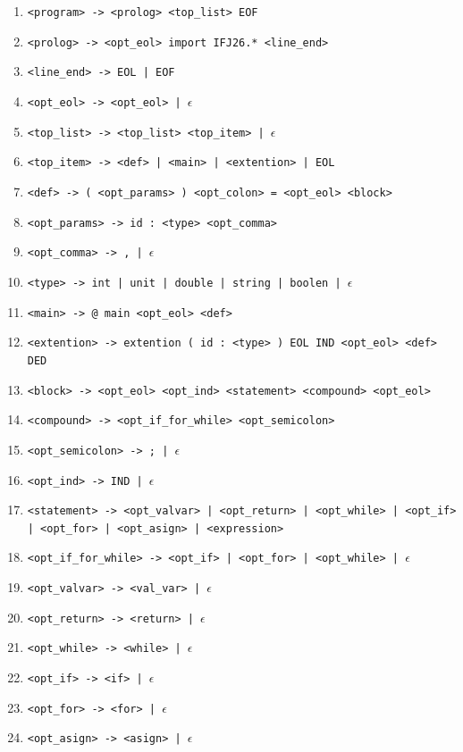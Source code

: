 \documentclass{article}
\begin{document}
\begin{enumerate}[label=\arabic*., leftmargin=2.2em, itemsep=1pt, parsep=0pt]
  \item \texttt{<program> -> <prolog> <top\_list> EOF}
  \item \texttt{<prolog> -> <opt\_eol> import IFJ26.* <line\_end>}
  \item \texttt{<line\_end> -> EOL | EOF}
  \item \texttt{<opt\_eol> -> <opt\_eol> | $\epsilon$}
  \item \texttt{<top\_list> -> <top\_list> <top\_item> | $\epsilon$}
  \item \texttt{<top\_item> -> <def> | <main> | <extention> | EOL}
  \item \texttt{<def> -> ( <opt\_params> ) <opt\_colon> = <opt\_eol> <block>}
  \item \texttt{<opt\_params> -> id : <type> <opt\_comma>}
  \item \texttt{<opt\_comma> -> , | $\epsilon$}
  \item \texttt{<type> -> int | unit | double | string | boolen | $\epsilon$}
  \item \texttt{<main> -> @ main <opt\_eol> <def>}
  \item \texttt{<extention> -> extention ( id : <type> ) EOL IND <opt\_eol> <def> DED}
  \item \texttt{<block> -> <opt\_eol> <opt\_ind> <statement> <compound> <opt\_eol>}
  \item \texttt{<compound> -> <opt\_if\_for\_while> <opt\_semicolon>}
  \item \texttt{<opt\_semicolon> -> ; | $\epsilon$}
  \item \texttt{<opt\_ind> -> IND | $\epsilon$}
  \item \texttt{<statement> -> <opt\_valvar> | <opt\_return> | <opt\_while> | <opt\_if> | <opt\_for> | <opt\_asign> | <expression>}
  \item \texttt{<opt\_if\_for\_while> -> <opt\_if> | <opt\_for> | <opt\_while> | $\epsilon$}
  \item \texttt{<opt\_valvar> -> <val\_var> | $\epsilon$}
  \item \texttt{<opt\_return> -> <return> | $\epsilon$}
  \item \texttt{<opt\_while> -> <while> | $\epsilon$}
  \item \texttt{<opt\_if> -> <if> | $\epsilon$}
  \item \texttt{<opt\_for> -> <for> | $\epsilon$}
  \item \texttt{<opt\_asign> -> <asign> | $\epsilon$}

\end{enumerate}
\end{document}
